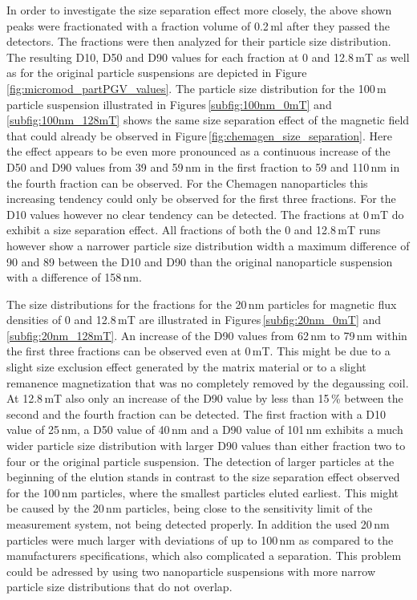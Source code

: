In order to investigate the size separation effect more closely, the above shown peaks were fractionated with a fraction volume of 0.2\,ml after they passed the detectors. The fractions were then analyzed for their particle size distribution.  The resulting D10, D50 and D90 values for each fraction at 0 and 12.8\,mT as well as for the original particle suspensions are depicted in Figure\,\ref{fig:micromod_partPGV_values}. The particle size distribution for the 100\,m particle suspension illustrated in Figures\,\ref{subfig:100nm_0mT} and \ref{subfig:100nm_128mT} shows the same size separation effect of the magnetic field that could already be observed in Figure\,\ref{fig:chemagen_size_separation}. Here the effect appears to be even more pronounced as a continuous increase of the D50 and D90 values from 39 and 59\,nm in the first fraction to 59 and 110\,nm in the fourth fraction can be observed. For the Chemagen nanoparticles this increasing tendency could only be observed for the first three fractions. For the D10 values however no clear tendency can be detected. The fractions at 0\,mT do exhibit a size separation effect. All fractions of both the 0 and 12.8\,mT runs however show a narrower particle size distribution width a maximum difference of 90 and 89 between the D10 and D90 than the original nanoparticle suspension with a difference of 158\,nm.

The size distributions for the fractions for the 20\,nm particles for magnetic flux densities of 0 and 12.8\,mT are illustrated in Figures\,\ref{subfig:20nm_0mT} and \ref{subfig:20nm_128mT}. An increase of the D90 values from 62\,nm to 79\,nm within the first three fractions can be observed even at 0\,mT. This might be due to a slight size exclusion effect generated by the matrix material or to a slight remanence magnetization that was no completely removed by the degaussing coil. At 12.8\,mT  also only an increase of the D90 value by less than 15\,\% between the second and the fourth fraction can be detected. The first fraction with a D10 value of 25\,nm, a D50 value of 40\,nm and a D90 value of 101\,nm exhibits a much wider particle size distribution with larger D90 values than either fraction two to four or the original particle suspension. The detection of larger particles at the beginning of the elution stands in contrast to the size separation effect observed for the 100\,nm particles, where the smallest particles eluted earliest. This might be caused by the 20\,nm particles, being close to the sensitivity limit of the measurement system, not being detected properly. In addition the used 20\,nm particles were much larger with deviations of up to 100\,nm as compared to the manufacturers specifications, which also complicated a separation. This problem could be adressed by using two nanoparticle suspensions with more narrow particle size distributions that do not overlap.  

